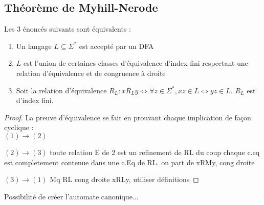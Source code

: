 \subsection{Théorème de Myhill-Nerode}
	
	\begin{theorem}
		Les 3 énoncés suivants sont équivalents :
		\begin{enumerate}
			\item Un langage $L\subseteq\Sigma^*$ est accepté par un DFA
			\item $L$ est l'union de certaines classes d'équivalence d'index fini respectant une relation d'équivalence et de congruence à droite
			\item Soit la relation d'équivalence $R_L : xR_Ly \Leftrightarrow \forall z \in \Sigma^*, xz \in L \Leftrightarrow yz \in L$. $R_L$ est d'index fini.
		\end{enumerate}
	\end{theorem}
	
	\begin{proof}La preuve d'équivalence se fait en prouvant chaque implication de façon cyclique :\\
		
		$(1)\rightarrow(2)$ 
		
		
		$(2)\rightarrow(3)$ toute relation E de 2 est un refinement de RL du coup chaque c.eq est completement contenue dans une c.Eq de RL. on part de xRMy, cong droite
		
		$(3)\rightarrow(1)$ Mq RL cong droite xRLy, utiliser définitions 
	\end{proof}


	\begin{corollary}
		Possibilité de créer l'automate canonique...
	\end{corollary}